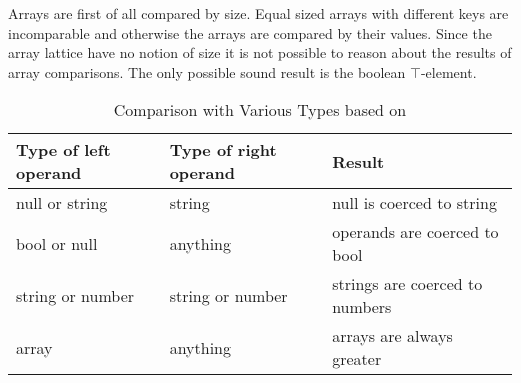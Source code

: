Arrays are first of all compared by size. Equal sized arrays with different keys are incomparable and otherwise the arrays are compared by their values. Since the array lattice have no notion of size it is not possible to reason about the results of array comparisons. The only possible sound result is the boolean $\top$-element.

\begin{table}[htbp]
\centering
\begin{tabular}{l|l||l}
Type of left operand & Type of right operand & Result \\\hline\hline
null or string & string & null is coerced to string \\\hline
bool or null & anything & operands are coerced to bool \\\hline
string or number & string or number & strings are coerced to numbers \\\hline
array & anything & arrays are always greater
\end{tabular}
\caption{Comparison with Various Types based on \protect{}}
\label{tab:comparisons}
\end{table}
